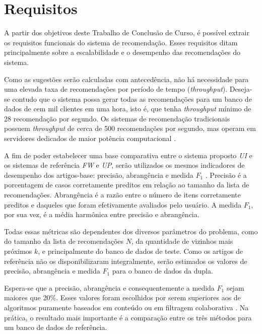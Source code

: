 \chapter[Requisitos]{Requisitos}
\label{chap:requisitos}

A partir dos objetivos deste Trabalho de Conclusão de Curso, é possível extrair os requisitos funcionais do sistema de recomendação. Esses requisitos ditam principalmente sobre a escalabilidade e o desempenho das recomendações do sistema.

Como as sugestões serão calculadas com antecedência, não há necessidade para uma elevada taxa de recomendações por período de tempo (\textit{throughput}). Deseja-se contudo que o sistema possa gerar todas as recomendações para um banco de dados de cem mil clientes em uma hora, isto é, que tenha \textit{throughput} mínimo de 28 recomendação por segundo. Os sistemas de recomendação tradicionais possuem \textit{throughput} de cerca de 500 recomendações por segundo, mas operam em servidores dedicados de maior potência computacional \cite{sarwar2001item}. 

A fim de poder estabelecer uma base comparativa entre o sistema proposto \textit{UI} e os sistemas de referência \textit{FW} e \textit{UP}, serão utilizados os mesmos indicadores de desempenho dos artigos-base: precisão, abrangência e medida $F_1$ \cite{symeonidis2007feature,debnath2008feature}. Precisão é a porcentagem de casos corretamente preditos em relação ao tamanho da lista de recomendações. Abrangência é a razão entre o número de itens corretamente preditos e daqueles que foram efetivamente avaliados pelo usuário. A medida $F_1$, por sua vez, é a média harmônica entre precisão e
abrangência.

Todas essas métricas são dependentes dos diversos parâmetros do problema, como do tamanho da lista de recomendações $N$, da quantidade de vizinhos mais próximos $k$, e principalmente do banco de dados de teste. Como os artigos de referência não os disponibilizaram integralmente, serão estimados os valores de precisão, abrangência e medida $F_1$ para o banco de dados da dupla. 

Espera-se que a precisão, abrangência e consequentemente a medida $F_1$ sejam maiores que 20\%. Esses valores foram escolhidos por serem superiores aos de algoritmos puramente baseados em conteúdo ou em filtragem colaborativa \cite{symeonidis2007feature,debnath2008feature}. Na prática, o resultado mais importante é a comparação entre os três métodos para um banco de dados de referência. 

